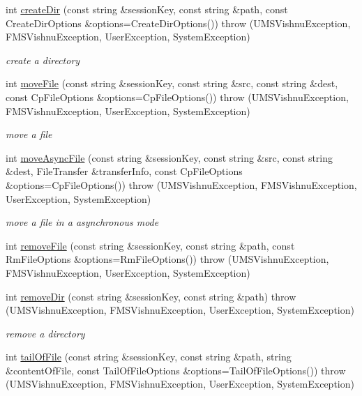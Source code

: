 \begin{DoxyCompactItemize}
int \hyperlink{namespacevishnu_af022c7861b9e2a8f9705c71f0e78b077}{createDir} (const string \&sessionKey, const string \&path, const CreateDirOptions \&options=CreateDirOptions())  throw (UMSVishnuException, FMSVishnuException, UserException, SystemException)
\begin{DoxyCompactList}\small\item\em create a directory \item\end{DoxyCompactList}\item 
int \hyperlink{namespacevishnu_aab0a15fe913c3cfb7f1ba8416b21f116}{moveFile} (const string \&sessionKey, const string \&src, const string \&dest, const CpFileOptions \&options=CpFileOptions())  throw (UMSVishnuException, FMSVishnuException, UserException, SystemException)
\begin{DoxyCompactList}\small\item\em move a file \item\end{DoxyCompactList}\item 
int \hyperlink{namespacevishnu_a1611f0d2a0056ab1c373211a5911b669}{moveAsyncFile} (const string \&sessionKey, const string \&src, const string \&dest, FileTransfer \&transferInfo, const CpFileOptions \&options=CpFileOptions())  throw (UMSVishnuException, FMSVishnuException, UserException, SystemException)
\begin{DoxyCompactList}\small\item\em move a file in a asynchronous mode \item\end{DoxyCompactList}\item 
int \hyperlink{namespacevishnu_aa524b5e536bf51e3ac68ec06ee429691}{removeFile} (const string \&sessionKey, const string \&path, const RmFileOptions \&options=RmFileOptions())  throw (UMSVishnuException, FMSVishnuException, UserException, SystemException)
\item 
int \hyperlink{namespacevishnu_a23105333be3ff847f7c274f6372364bc}{removeDir} (const string \&sessionKey, const string \&path)  throw (UMSVishnuException, FMSVishnuException, UserException, SystemException)
\begin{DoxyCompactList}\small\item\em remove a directory \item\end{DoxyCompactList}\item 
int \hyperlink{namespacevishnu_aa8c92237272b5c0e92360f617a2a4edc}{tailOfFile} (const string \&sessionKey, const string \&path, string \&contentOfFile, const TailOfFileOptions \&options=TailOfFileOptions())  throw (UMSVishnuException, FMSVishnuException, UserException, SystemException)

\end{DoxyCompactItemize}
